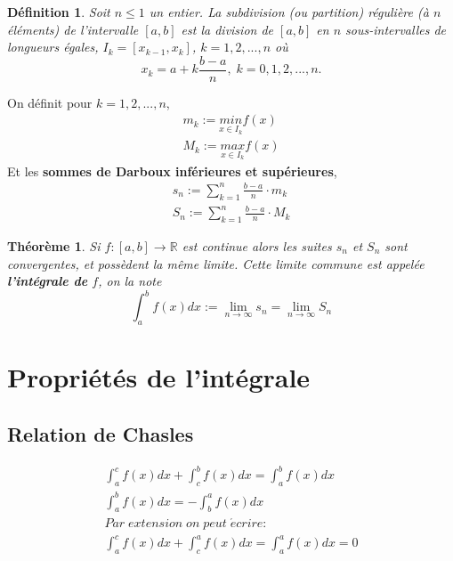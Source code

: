 \documentclass[10pt,a4paper]{book}
\newcommand{\R}{\mathbb{R}}
\newtheorem{theorem}{Théorème}[section]
\newtheorem{definition}{Définition}[section]
\begin{document}
\begin{definition}
Soit $n\leq 1$ un entier. La subdivision (ou partition) régulière (à $n$ éléments) de l'intervalle $[a,b]$ est la division de $[a,b]$ en $n$ sous-intervalles de longueurs égales, $I_k=[x_{k-1},x_k]$, $k = 1, 2, ..., n$ où
\[x_k = a + k\frac{b-a}{n}, \; k = 0,1,2,...,n.\]
\end{definition}

On définit pour $k=1,2,...,n$,
\begin{equation*}
\begin{split}
m_k := \underset{x \in I_k}{min}f(x) \\
M_k := \underset{x \in I_k}{max}f(x)
\end{split}
\end{equation*}
Et les \textbf{sommes de Darboux inférieures et supérieures},
\begin{equation*}
\begin{split}
s_n := \sum^n_{k=1} \frac{b-a}{n}\cdot m_k \\
S_n := \sum^n_{k=1} \frac{b-a}{n}\cdot M_k
\end{split}
\end{equation*}

\begin{theorem}
Si $f:[a,b] \rightarrow \R$ est continue alors les suites $s_n$ et $S_n$ sont convergentes, et possèdent la même limite. Cette limite commune est appelée \textbf{l'intégrale de} $f$, on la note
\[\int_a^b f(x)dx := \lim_{n\rightarrow \infty} s_n = \lim_{n\rightarrow \infty} S_n \]
\end{theorem}

\section{Propriétés de l'intégrale}

\subsection{Relation de Chasles}

\begin{equation*}
\begin{split}
\int_a^c f(x)dx + \int_c^b f(x)dx = \int_a^b f(x)dx \\
\int_a^b f(x)dx = -\int_b^a f(x)dx \\
Par\; extension\; on\; peut\; \acute{e}crire: \\
\int_a^c f(x)dx + \int_c^a f(x)dx = \int_a^a f(x)dx = 0
\end{split}
\end{equation*}
\end{document}
